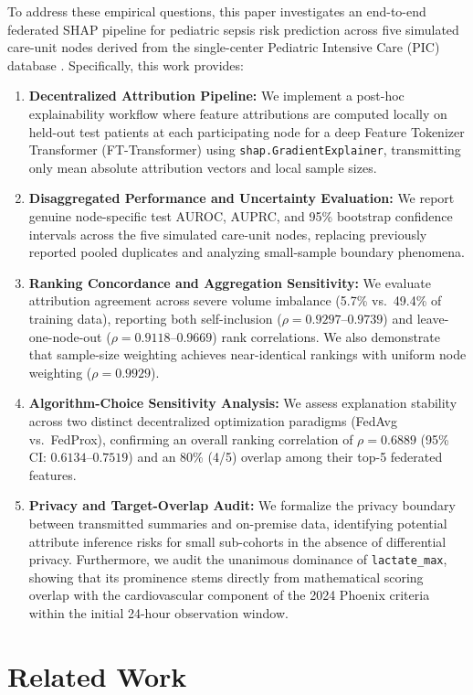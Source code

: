 \documentclass[runningheads]{llncs}
\begin{document}
To address these empirical questions, this paper investigates an end-to-end federated SHAP pipeline for pediatric sepsis risk prediction across five simulated care-unit nodes derived from the single-center Pediatric Intensive Care (PIC) database \cite{zeng2020pic}. Specifically, this work provides:
\begin{enumerate}
\item \textbf{Decentralized Attribution Pipeline:} We implement a post-hoc explainability workflow where feature attributions are computed locally on held-out test patients at each participating node for a deep Feature Tokenizer Transformer (FT-Transformer) using \texttt{shap.GradientExplainer}, transmitting only mean absolute attribution vectors and local sample sizes.
\item \textbf{Disaggregated Performance and Uncertainty Evaluation:} We report genuine node-specific test AUROC, AUPRC, and 95\% bootstrap confidence intervals across the five simulated care-unit nodes, replacing previously reported pooled duplicates and analyzing small-sample boundary phenomena.
\item \textbf{Ranking Concordance and Aggregation Sensitivity:} We evaluate attribution agreement across severe volume imbalance (5.7\% vs.\ 49.4\% of training data), reporting both self-inclusion ($\rho = 0.9297$--$0.9739$) and leave-one-node-out ($\rho = 0.9118$--$0.9669$) rank correlations. We also demonstrate that sample-size weighting achieves near-identical rankings with uniform node weighting ($\rho = 0.9929$).
\item \textbf{Algorithm-Choice Sensitivity Analysis:} We assess explanation stability across two distinct decentralized optimization paradigms (FedAvg vs.\ FedProx), confirming an overall ranking correlation of $\rho = 0.6889$ (95\% CI: $0.6134$--$0.7519$) and an 80\% (4/5) overlap among their top-5 federated features.
\item \textbf{Privacy and Target-Overlap Audit:} We formalize the privacy boundary between transmitted summaries and on-premise data, identifying potential attribute inference risks for small sub-cohorts in the absence of differential privacy. Furthermore, we audit the unanimous dominance of \texttt{lactate\_max}, showing that its prominence stems directly from mathematical scoring overlap with the cardiovascular component of the 2024 Phoenix criteria within the initial 24-hour observation window.
\end{enumerate}

\section{Related Work}\label{sec:litreview}
\end{document}
